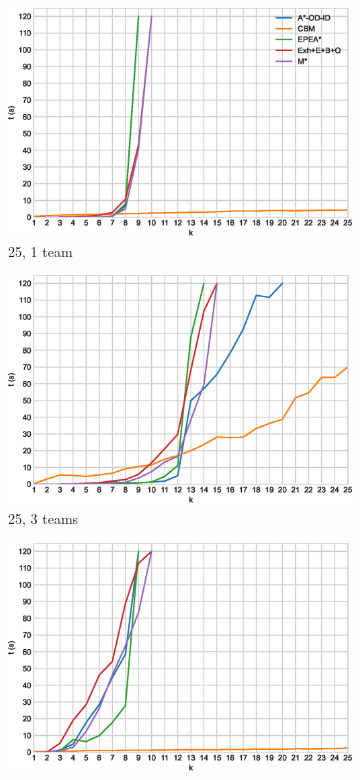 \documentclass[english,10pt]{article}
\begin{document}
	\begin{figure}[t]
		\centering
		\begin{subfigure}{0.44\textwidth}
			\centering
			\includegraphics[width=\linewidth]{img/results/relative-comparison/25-1}
			\caption{25, 1 team}
			\label{fig:25-1-p}
		\end{subfigure}
		\begin{subfigure}{0.44\textwidth}
			\centering
			\includegraphics[width=\linewidth]{img/results/relative-comparison/25-3}
			\caption{25, 3 teams}
			\label{fig:25-3-p}
		\end{subfigure}
		\begin{subfigure}{0.44\textwidth}
			\centering
			\includegraphics[width=\linewidth]{img/results/relative-comparison/75-1}

\end{subfigure}
\end{figure}
\end{document}
